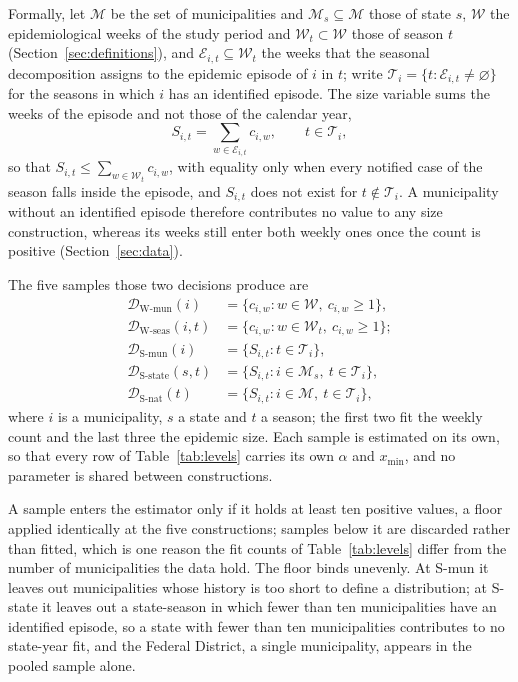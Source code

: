 \documentclass[english,10pt,b5paper]{article}
\newcommand{\lvl}[1]{\mbox{#1}}
\begin{document}
Formally, let $\mathcal{M}$ be the set of municipalities and
$\mathcal{M}_s\subseteq\mathcal{M}$ those of state $s$, $\mathcal{W}$ the
epidemiological weeks of the study period and
$\mathcal{W}_t\subset\mathcal{W}$ those of season $t$
(Section~\ref{sec:definitions}), and $\mathcal{E}_{i,t}\subseteq\mathcal{W}_t$
the weeks that the seasonal decomposition assigns to the epidemic episode of
$i$ in $t$; write $\mathcal{T}_i=\{t:\mathcal{E}_{i,t}\neq\varnothing\}$ for
the seasons in which $i$ has an identified episode. The size variable sums the
weeks of the episode and not those of the calendar year,
%
\[
S_{i,t}=\sum_{w\in\mathcal{E}_{i,t}}c_{i,w},\qquad t\in\mathcal{T}_i,
\]
%
so that $S_{i,t}\le\sum_{w\in\mathcal{W}_t}c_{i,w}$, with equality only when
every notified case of the season falls inside the episode, and $S_{i,t}$ does
not exist for $t\notin\mathcal{T}_i$. A municipality without an identified
episode therefore contributes no value to any size construction, whereas its
weeks still enter both weekly ones once the count is positive
(Section~\ref{sec:data}).

The five samples those two decisions produce are
%
\begin{align*}
\mathcal{D}_{\text{W-mun}}(i)     &= \{c_{i,w} : w\in\mathcal{W},\ c_{i,w}\ge
1\},\\ \mathcal{D}_{\text{W-seas}}(i,t)  &= \{c_{i,w} : w\in\mathcal{W}_t,\
c_{i,w}\ge 1\};\\[2pt] \mathcal{D}_{\text{S-mun}}(i)     &= \{S_{i,t} :
t\in\mathcal{T}_i\},\\ \mathcal{D}_{\text{S-state}}(s,t) &= \{S_{i,t} :
i\in\mathcal{M}_s,\ t\in\mathcal{T}_i\},\\ \mathcal{D}_{\text{S-nat}}(t)
&= \{S_{i,t} : i\in\mathcal{M},\ t\in\mathcal{T}_i\},
\end{align*}
%
where $i$ is a municipality, $s$ a state and $t$ a season; the first two fit
the weekly count and the last three the epidemic size. Each sample is
estimated on its own, so that every row of Table~\ref{tab:levels} carries its
own $\alpha$ and $x_{\min}$, and no parameter is shared between constructions.

A sample enters the estimator only if it holds at least ten positive values, a
floor applied identically at the five constructions; samples below it are
discarded rather than fitted, which is one reason the fit counts of
Table~\ref{tab:levels} differ from the number of municipalities the data hold.
The floor binds unevenly. At \lvl{S-mun} it leaves out municipalities whose
history is too short to define a distribution; at \lvl{S-state} it leaves out
a state-season in which fewer than ten municipalities have an identified
episode, so a state with fewer than ten municipalities contributes to no
state-year fit, and the Federal District, a single municipality, appears in
the pooled sample alone.
\end{document}
